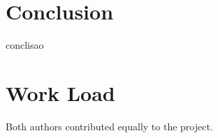 \documentclass[conference]{IEEEtran}
\begin{document}
\section{Conclusion}

conclisao


\section*{Work Load}

Both authors contributed equally to the project.



\end{document}
